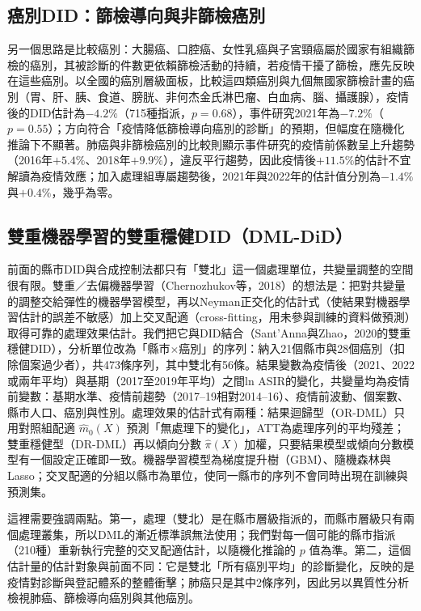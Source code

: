 \documentclass[UTF8,a4paper,11pt]{ctexart}
\begin{document}
\subsection{癌別DID：篩檢導向與非篩檢癌別}
另一個思路是比較癌別：大腸癌、口腔癌、女性乳癌與子宮頸癌屬於國家有組織篩檢的癌別，其被診斷的件數更依賴篩檢活動的持續，若疫情干擾了篩檢，應先反映在這些癌別。以全國的癌別層級面板，比較這四類癌別與九個無國家篩檢計畫的癌別（胃、肝、胰、食道、膀胱、非何杰金氏淋巴瘤、白血病、腦、攝護腺），疫情後的DID估計為$-4.2\%$（715種指派，$p=0.68$），事件研究2021年為$-7.2\%$（$p=0.55$）；方向符合「疫情降低篩檢導向癌別的診斷」的預期，但幅度在隨機化推論下不顯著。肺癌與非篩檢癌別的比較則顯示事件研究的疫情前係數呈上升趨勢（2016年$+5.4\%$、2018年$+9.9\%$），違反平行趨勢，因此疫情後$+11.5\%$的估計不宜解讀為疫情效應；加入處理組專屬趨勢後，2021年與2022年的估計值分別為$-1.4\%$與$+0.4\%$，幾乎為零。

\subsection{雙重機器學習的雙重穩健DID（DML-DiD）}
前面的縣市DID與合成控制法都只有「雙北」這一個處理單位，共變量調整的空間很有限。雙重／去偏機器學習（Chernozhukov等，2018）的想法是：把對共變量的調整交給彈性的機器學習模型，再以Neyman正交化的估計式（使結果對機器學習估計的誤差不敏感）加上交叉配適（cross-fitting，用未參與訓練的資料做預測）取得可靠的處理效果估計。我們把它與DID結合（Sant'Anna與Zhao，2020的雙重穩健DID），分析單位改為「縣市$\times$癌別」的序列：納入21個縣市與28個癌別（扣除個案過少者），共473條序列，其中雙北有56條。結果變數為疫情後（2021、2022或兩年平均）與基期（2017至2019年平均）之間ln ASIR的變化，共變量均為疫情前變數：基期水準、疫情前趨勢（2017--19相對2014--16）、疫情前波動、個案數、縣市人口、癌別與性別。處理效果的估計式有兩種：結果迴歸型（OR-DML）只用對照組配適 $\hat m_0(X)$ 預測「無處理下的變化」，ATT為處理序列的平均殘差；雙重穩健型（DR-DML）再以傾向分數 $\hat\pi(X)$ 加權，只要結果模型或傾向分數模型有一個設定正確即一致。機器學習模型為梯度提升樹（GBM）、隨機森林與Lasso；交叉配適的分組以縣市為單位，使同一縣市的序列不會同時出現在訓練與預測集。

這裡需要強調兩點。第一，處理（雙北）是在縣市層級指派的，而縣市層級只有兩個處理叢集，所以DML的漸近標準誤無法使用；我們對每一個可能的縣市指派（210種）重新執行完整的交叉配適估計，以隨機化推論的 $p$ 值為準。第二，這個估計量的估計對象與前面不同：它是雙北「所有癌別平均」的診斷變化，反映的是疫情對診斷與登記體系的整體衝擊；肺癌只是其中2條序列，因此另以異質性分析檢視肺癌、篩檢導向癌別與其他癌別。
\end{document}
